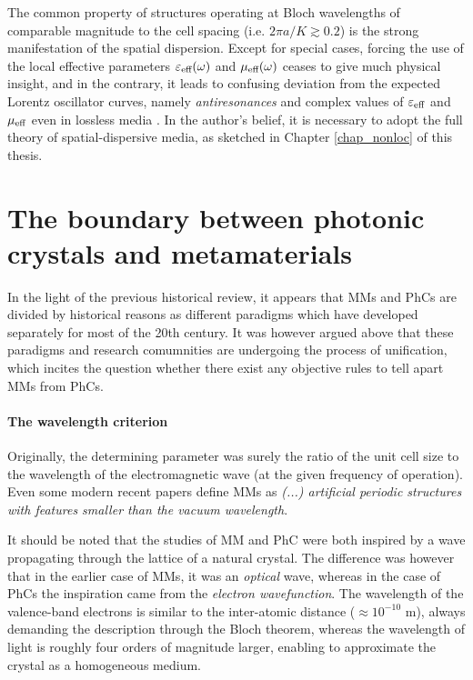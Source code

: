 The common property of structures operating at Bloch wavelengths of comparable magnitude to the cell spacing (i.e. $2\pi a/K \gtrsim 0.2$) is the strong manifestation of the spatial dispersion. Except for special cases, forcing the use of the local effective parameters $\varepsilon_{\text{eff} }(\omega)$ and $\mu_{\text{eff} }(\omega)$ ceases to give much physical insight, and in the contrary, it leads to confusing deviation from the expected Lorentz oscillator curves, namely \textit{antiresonances} \cite{koschny2003resonant}  and complex values of $\varepsilon_{\text{eff} }$ and $\mu_{\text{eff} }$ even in lossless media \cite{chan2003}.
In the author's belief, it is necessary to adopt the full theory of spatial-dispersive media, as sketched in Chapter \ref{chap_nonloc} of this thesis.


\section{The boundary between photonic crystals and metamaterials} 
In the light of the previous historical review, it appears that MMs and PhCs are divided by historical reasons as different paradigms which have developed separately for most of the 20th century. It was however argued above that these paradigms and research comumnities are undergoing the process of unification, which incites the question whether there exist any objective rules to tell apart MMs from PhCs.

\paragraph{The wavelength criterion} %
Originally, the determining parameter was surely the ratio of the unit cell size to the wavelength of the electromagnetic wave (at the given frequency of operation).
Even some modern recent papers \cite{tsukerman2011nonlocal} define MMs as \textit{(...) artificial periodic structures with features smaller than the vacuum wavelength}.

It should be noted that the studies of MM and PhC were both inspired by a wave propagating through the lattice of a natural crystal. The difference was however that in the earlier case of MMs, it was an \textit{optical} wave, whereas in the case of PhCs the inspiration came from the \textit{electron wavefunction}. The wavelength of the valence-band electrons is similar to the inter-atomic distance ($\approx 10^{-10}$ m), always demanding the description through the Bloch theorem, whereas the wavelength of light is roughly four orders of magnitude larger, enabling to approximate the crystal as a homogeneous medium.

